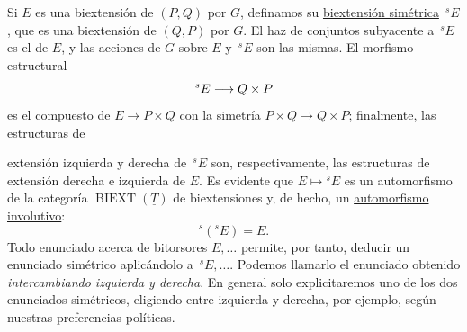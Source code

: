 Si $E$ es una biextensión de $(P,Q)$ por $G$, definamos su
\underline{biextensión simétrica} $\,{}^{s}E$, que es una biextensión
de $(Q,P)$ por $G$. El haz de conjuntos subyacente a $\,{}^{s}E$ es el
de $E$, y las acciones de $G$ sobre $E$ y $\,{}^{s}E$ son las mismas.
El morfismo estructural
\[
 {}^{s}E\longrightarrow \sisi{P\times Q}{Q\times P}
\]
es el compuesto de $E\longrightarrow P\times Q$ con la simetría
$P\times Q\longrightarrow Q\times P$; finalmente, las estructuras de


extensión izquierda y derecha de $\,{}^{s}E$ son, respectivamente,
las estructuras de extensión derecha e izquierda de $E$. Es evidente
que $E\mapsto{}^{s}E$ es un automorfismo de la categoría
$\operatorname{BIEXT}(\underline T)$ de biextensiones y, de hecho, un
\underline{automorfismo involutivo}:
\[
 {}^{s}({}^{s}E)=E.
\]
Todo enunciado acerca de bitorsores $E,\ldots$ permite, por tanto,
deducir un enunciado simétrico aplicándolo a $\,{}^{s}E,\ldots$.
Podemos llamarlo el enunciado obtenido \emph{intercambiando izquierda y
derecha}. En general solo explicitaremos uno de los dos enunciados
simétricos, eligiendo entre izquierda y derecha, por ejemplo, según
nuestras preferencias políticas.

